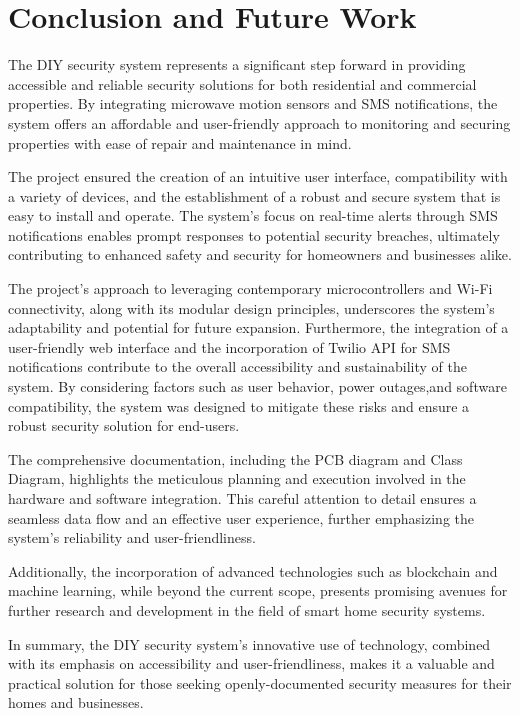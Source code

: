 \section{Conclusion and Future Work}\label{sec:conclusion-and-future-work}

The \brand{} DIY security system represents a significant step forward in providing
accessible and reliable security solutions for both residential and commercial properties. %
By integrating microwave motion sensors and SMS notifications, the system offers an
affordable and user-friendly approach to monitoring and securing properties with ease of
repair and maintenance in mind. %

The project ensured the creation of an intuitive user interface, compatibility with a variety
of devices, and the establishment of a robust and secure system that is easy to install and operate. %
The system's focus on real-time alerts through SMS notifications enables prompt responses to
potential security breaches, ultimately contributing to enhanced safety and security for
homeowners and businesses alike. %

The project's approach to leveraging contemporary microcontrollers and Wi-Fi connectivity, along
with its modular design principles, underscores the system's adaptability and potential for
future expansion. %
Furthermore, the integration of a user-friendly web interface and the incorporation of Twilio API for SMS notifications contribute to the overall accessibility
and sustainability of the system. %
By considering factors such as user behavior, power outages,and software compatibility, the system was designed to mitigate these risks and ensure a
robust security solution for end-users. %

The comprehensive documentation, including the PCB diagram and Class Diagram, highlights the
meticulous planning and execution involved in the hardware and software integration. %
This careful attention to detail ensures a seamless data flow and an effective user experience,
further emphasizing the system's reliability and user-friendliness. %

Additionally, the incorporation of advanced technologies such as blockchain and machine
learning, while beyond the current scope, presents promising avenues for further
research and development in the field of smart home security systems. %

In summary, the \brand{} DIY security system's innovative use of technology, combined with
its emphasis on accessibility and user-friendliness, makes it a valuable and practical
solution for those seeking openly-documented security measures for their homes and businesses. %

